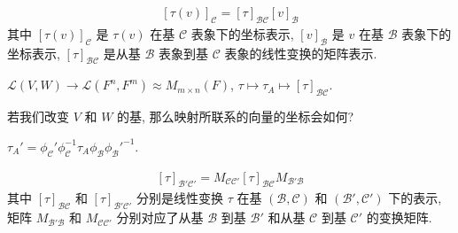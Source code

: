 \documentclass{note}
\begin{document}
\begin{thm}[(课本定理 2.14)]
    \begin{align*}
        \boxed{[\tau(v)]_{\mathcal{C}}=[\tau]_{\mathcal{BC}}[v]_{\mathcal{B}}}
    \end{align*}
    其中 $[\tau(v)]_{\mathcal{C}}$ 是 $\tau(v)$ 在基 $\mathcal{C}$ 表象下的坐标表示, $[v]_{\mathcal{B}}$ 是 $v$ 在基 $\mathcal{B}$ 表象下的坐标表示, $[\tau]_{\mathcal{BC}}$ 是从基 $\mathcal{B}$ 表象到基 $\mathcal{C}$ 表象的线性变换的矩阵表示.
\end{thm}

\begin{thm}[(课本定理 2.15)]
    $\mathcal{L}(V,W)\rightarrow\mathcal{L}(F^n,F^m)\approx M_{m\times n}(F)$, $\tau\mapsto\tau_A\mapsto[\tau]_{\mathcal{BC}}$.
\end{thm}

若我们改变 $V$ 和 $W$ 的基, 那么映射所联系的向量的坐标会如何?

\begin{center}
\end{center}

$\tau_A'=\phi_{\mathcal{C}}'\phi_{\mathcal{C}}^{-1}\tau_A\phi_{\mathcal{B}}\phi_{\mathcal{B}}'^{-1}$.

\begin{thm}[(课本定理 2.16)]
    \begin{align*}
        \boxed{[\tau]_{\mathcal{B'C'}}=M_{\mathcal{CC}'}[\tau]_{\mathcal{BC}}M_{\mathcal{B'B}}}
    \end{align*}
    其中 $[\tau]_{\mathcal{BC}}$ 和 $[\tau]_{\mathcal{B'C'}}$ 分别是线性变换 $\tau$ 在基 $(\mathcal{B},\mathcal{C})$ 和 $(\mathcal{B}',\mathcal{C}')$ 下的表示, 矩阵 $M_{\mathcal{B'B}}$ 和 $M_{\mathcal{CC}'}$ 分别对应了从基 $\mathcal{B}$ 到基 $\mathcal{B}'$ 和从基 $\mathcal{C}$ 到基 $\mathcal{C}'$ 的变换矩阵.
\end{thm}
\end{document}

